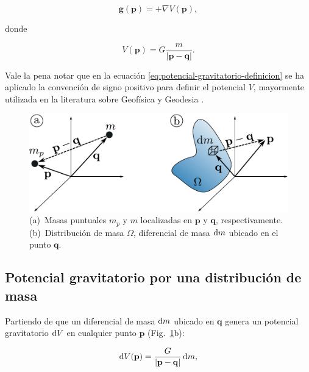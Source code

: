 \begin{equation}
    \mathbf{g}(\mathbf{p}) = + \nabla V(\mathbf{p}),
    \label{eq:potencial-gravitatorio-definicion}
\end{equation}

\noindent donde

\begin{equation}
    V(\mathbf{p}) = G \frac{m}{|\mathbf{p} - \mathbf{q}|}.
    \label{eq:potencial-gravitatorio-particula}
\end{equation}

\noindent Vale la pena notar que en la ecuación
\ref{eq:potencial-gravitatorio-definicion} se ha aplicado la convención de
signo positivo para definir el potencial $V$, mayormente utilizada en la
literatura sobre Geofísica y Geodesia
\citep{heiskanen1967,blakely1995,hinze2009}.

\begin{figure}
    \centering
    \includegraphics[width=\linewidth]{figs/gravity-potentials.pdf}
    \caption{
        (a)~Masas puntuales $m_p$ y $m$ localizadas en $\mathbf{p}$
        y $\mathbf{q}$, respectivamente.
        (b)~Distribución de masa $\Omega$, diferencial de masa $\mathop{}\!\textnormal{d} m$
        ubicado en el punto $\mathbf{q}$.
    }
    \label{fig:potencial-gravitatorio}
\end{figure}


\subsection{Potencial gravitatorio por una distribución de masa}

Partiendo de que un diferencial de masa $\mathop{}\!\textnormal{d} m$ ubicado en $\mathbf{q}$
genera un potencial gravitatorio $\mathop{}\!\textnormal{d} V$ en cualquier punto $\mathbf{p}$
(Fig.~\ref{fig:potencial-gravitatorio}b):

\begin{equation}
    \mathop{}\!\textnormal{d} V(\mathbf{p}) = \frac{G}{|\mathbf{p} - \mathbf{q}|} \mathop{}\!\textnormal{d} m,
\end{equation}

